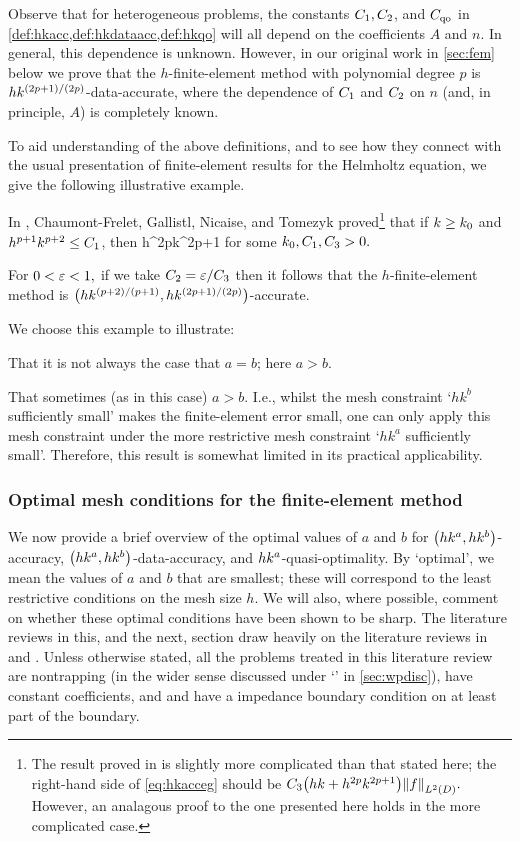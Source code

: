 Observe that for heterogeneous problems, the constants $C_{1}, C_{2}$, and $C_{\mathrm{qo}}$ in \cref{def:hkacc,def:hkdataacc,def:hkqo} will all depend on the coefficients $A$ and $n.$ In general, this dependence is unknown. However, in our original work in \cref{sec:fem} below we prove that the $h$-finite-element method with polynomial degree $p$ is $hk^{(2p+1)/(2p)}$-data-accurate, where the dependence of $C_{1}$ and $C_{2}$ on $n$ (and, in principle, $A$) is completely known.
\ere

To aid understanding of the above definitions, and to see how they connect with the usual presentation of finite-element results for the Helmholtz equation, we give the following illustrative example.

\label{rem:dataacc}
In \cite[Theorem 5.4]{ChGaNiTo:18}, Chaumont-Frelet, Gallistl, Nicaise, and Tomezyk proved\footnote{The result proved in \cite[Theorem 5.4]{ChGaNiTo:18} is slightly more complicated than that stated here; the right-hand side of \cref{eq:hkacceg} should be $\Cth \mleft(hk + h^{2p}k^{2p+1}\mright)\NLtD{f}.$ However, an analagous proof to the one presented here holds in the more complicated case.} that if $k \geq k_{0}$ and $h^{p+1}k^{p+2} \leq C_{1}$, then
\beq\label{eq:hkacceg}
 \leq \Cth h^{2p}k^{2p+1}
\eeq
for some $k_{0}, C_{1}, C_{3} > 0.$

For $0 < \varepsilon < 1,$ if we take $C_{2} = \varepsilon/C_{3}$ then it follows that the $h$-finite-element method is $\hk{(p+2)/(p+1)}{(2p+1)/(2p)}$-accurate.

We choose this example to illustrate:
\bit
\item That it is not always the case that $a=b$; here $a > b.$
\item That sometimes (as in this case) $a > b.$ I.e., whilst the mesh constraint `$hk^b$ sufficiently small' makes the finite-element error small, one can only apply this mesh constraint under the more restrictive mesh constraint `$hk^a$ sufficiently small'. Therefore, this result is somewhat limited in its practical applicability.
\eit
\ere

\subsubsection{Optimal mesh conditions for the finite-element method}

We now provide a brief overview of the optimal values of $a$ and $b$ for $\hk{a}{b}$-accuracy, $\hk{a}{b}$-data-accuracy, and $hk^{a}$-quasi-optimality. By `optimal', we mean the values of $a$ and $b$ that are smallest; these will correspond to the least restrictive conditions on the mesh size $h$. We will also, where possible, comment on whether these optimal conditions have been shown to be sharp. The literature reviews in this, and the next, section draw heavily on the literature reviews in \cite[pp. 182--183]{GrLoMeSp:14} and \cite[p. 112]{DiMoSp:19}. Unless otherwise stated, all the problems treated in this literature review are nontrapping (in the wider sense discussed under `\techtitle' in \cref{sec:wpdisc}), have constant coefficients, and and have a impedance boundary condition on at least part of the boundary.

